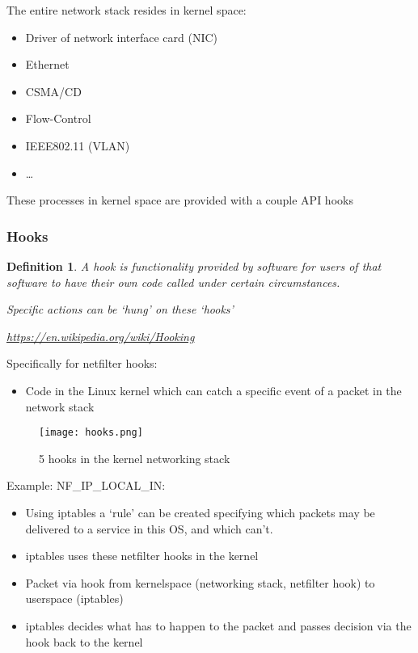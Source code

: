 \documentclass{article}
\newtheorem{theorem}{Definition}[section]
\begin{document}
The entire network stack resides in kernel space:

\begin{itemize}
    \item Driver of network interface card (NIC)
    \item Ethernet
    \item CSMA/CD
    \item Flow-Control
    \item IEEE802.11 (VLAN)
    \item \dots
\end{itemize}

These processes in kernel space are provided with a couple API hooks

\subsubsection{Hooks}

\begin{theorem}
    A hook is functionality provided by software for users of that software
    to have their own code called under certain circumstances.

    Specific actions can be `hung' on these `hooks'

    \url{https://en.wikipedia.org/wiki/Hooking}
\end{theorem}

Specifically for netfilter hooks:

\begin{itemize}
    \item Code in the Linux kernel which can catch a specific event of a packet in the network stack
\end{itemize}

\begin{figure}[H]
    \centering
    \texttt{[image: hooks.png]}
    \caption{5 hooks in the kernel networking stack}
\end{figure}

Example: NF\_IP\_LOCAL\_IN:

\begin{itemize}
    \item Using iptables a `rule' can be created specifying which packets may be delivered to a service in this OS, and which can't.
    \item iptables uses these netfilter hooks in the kernel
    \item Packet via hook from kernelspace (networking stack, netfilter hook) to userspace (iptables)
    \item iptables decides what has to happen to the packet and passes decision via the hook back to the kernel
\end{itemize}
\end{document}
